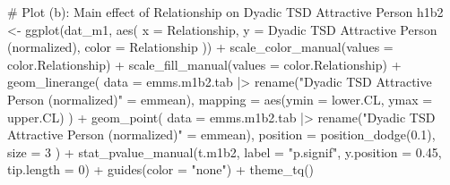 \documentclass[
  bookmarksnumbered]{article}
\newenvironment{Shaded}{\begin{snugshade}}{\end{snugshade}}
\newcommand{\AttributeTok}[1]{\textcolor[rgb]{0.80,0.80,0.80}{#1}}
\newcommand{\CommentTok}[1]{\textcolor[rgb]{0.50,0.62,0.50}{#1}}
\newcommand{\DecValTok}[1]{\textcolor[rgb]{0.86,0.86,0.80}{#1}}
\newcommand{\FloatTok}[1]{\textcolor[rgb]{0.75,0.75,0.82}{#1}}
\newcommand{\FunctionTok}[1]{\textcolor[rgb]{0.94,0.94,0.56}{#1}}
\newcommand{\NormalTok}[1]{\textcolor[rgb]{0.80,0.80,0.80}{#1}}
\newcommand{\OtherTok}[1]{\textcolor[rgb]{0.94,0.94,0.56}{#1}}
\newcommand{\SpecialCharTok}[1]{\textcolor[rgb]{0.86,0.64,0.64}{#1}}
\newcommand{\StringTok}[1]{\textcolor[rgb]{0.80,0.58,0.58}{#1}}
\begin{document}
\begin{Shaded}
\begin{Highlighting}[]
\CommentTok{\# Plot (b): Main effect of Relationship on Dyadic TSD Attractive Person}
\NormalTok{h1b2 }\OtherTok{\textless{}{-}} \FunctionTok{ggplot}\NormalTok{(dat\_m1, }\FunctionTok{aes}\NormalTok{(}
  \AttributeTok{x =}\NormalTok{ Relationship, }\AttributeTok{y =} \StringTok{\textasciigrave{}}\AttributeTok{Dyadic TSD Attractive Person (normalized)}\StringTok{\textasciigrave{}}\NormalTok{, }\AttributeTok{color =}\NormalTok{ Relationship}
\NormalTok{)) }\SpecialCharTok{+}
  \FunctionTok{scale\_color\_manual}\NormalTok{(}\AttributeTok{values =}\NormalTok{ color.Relationship) }\SpecialCharTok{+}
  \FunctionTok{scale\_fill\_manual}\NormalTok{(}\AttributeTok{values =}\NormalTok{ color.Relationship) }\SpecialCharTok{+}
  \FunctionTok{geom\_linerange}\NormalTok{(}
    \AttributeTok{data =}\NormalTok{ emms.m1b2.tab }\SpecialCharTok{|\textgreater{}} \FunctionTok{rename}\NormalTok{(}\StringTok{"Dyadic TSD Attractive Person (normalized)"} \OtherTok{=}\NormalTok{ emmean),}
    \AttributeTok{mapping =} \FunctionTok{aes}\NormalTok{(}\AttributeTok{ymin =}\NormalTok{ lower.CL, }\AttributeTok{ymax =}\NormalTok{ upper.CL)}
\NormalTok{  ) }\SpecialCharTok{+}
  \FunctionTok{geom\_point}\NormalTok{(}
    \AttributeTok{data =}\NormalTok{ emms.m1b2.tab }\SpecialCharTok{|\textgreater{}} \FunctionTok{rename}\NormalTok{(}\StringTok{"Dyadic TSD Attractive Person (normalized)"} \OtherTok{=}\NormalTok{ emmean),}
    \AttributeTok{position =} \FunctionTok{position\_dodge}\NormalTok{(}\FloatTok{0.1}\NormalTok{), }\AttributeTok{size =} \DecValTok{3}
\NormalTok{  ) }\SpecialCharTok{+}
  \FunctionTok{stat\_pvalue\_manual}\NormalTok{(t.m1b2, }\AttributeTok{label =} \StringTok{"p.signif"}\NormalTok{, }\AttributeTok{y.position =} \FloatTok{0.45}\NormalTok{, }\AttributeTok{tip.length =} \DecValTok{0}\NormalTok{) }\SpecialCharTok{+}
  \FunctionTok{guides}\NormalTok{(}\AttributeTok{color =} \StringTok{"none"}\NormalTok{) }\SpecialCharTok{+}
  \FunctionTok{theme\_tq}\NormalTok{()}


\end{Highlighting}
\end{Shaded}
\end{document}
